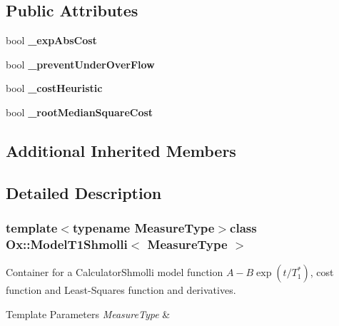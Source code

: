 \subsection*{Public Attributes}
\begin{DoxyCompactItemize}
\item 
\hypertarget{class_ox_1_1_model_t1_shmolli_a9ef12784ac237845296da239cd4517f2}{bool {\bfseries \-\_\-exp\-Abs\-Cost}}\label{class_ox_1_1_model_t1_shmolli_a9ef12784ac237845296da239cd4517f2}

\item 
\hypertarget{class_ox_1_1_model_t1_shmolli_aa7fd686c2f08a4ed27d33b934fcad37f}{bool {\bfseries \-\_\-prevent\-Under\-Over\-Flow}}\label{class_ox_1_1_model_t1_shmolli_aa7fd686c2f08a4ed27d33b934fcad37f}

\item 
\hypertarget{class_ox_1_1_model_t1_shmolli_adc598e5bee08606512d2a823536f7b3d}{bool {\bfseries \-\_\-cost\-Heuristic}}\label{class_ox_1_1_model_t1_shmolli_adc598e5bee08606512d2a823536f7b3d}

\item 
\hypertarget{class_ox_1_1_model_t1_shmolli_a043784373e50e27f8dfbdd42d82eb290}{bool {\bfseries \-\_\-root\-Median\-Square\-Cost}}\label{class_ox_1_1_model_t1_shmolli_a043784373e50e27f8dfbdd42d82eb290}

\end{DoxyCompactItemize}
\subsection*{Additional Inherited Members}


\subsection{Detailed Description}
\subsubsection*{template$<$typename Measure\-Type$>$class Ox\-::\-Model\-T1\-Shmolli$<$ Measure\-Type $>$}

Container for a Calculator\-Shmolli model function $ A-B\exp(t/T_1^*) $, cost function and Least-\/\-Squares function and derivatives. 


\begin{DoxyTemplParams}{Template Parameters}
{\em Measure\-Type} & \\
\hline
\end{DoxyTemplParams}


